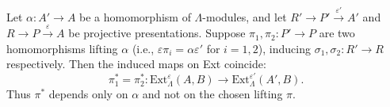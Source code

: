 Let $\alpha : A' \to A$ be a homomorphism of $\Lambda$-modules, and let $R' \to P' \xrightarrow{\varepsilon'} A'$ and $R \to P \xrightarrow{\varepsilon} A$ be projective presentations. Suppose $\pi_1, \pi_2 : P' \to P$ are two homomorphisms lifting $\alpha$ (i.e., $\varepsilon \pi_i = \alpha \varepsilon'$ for $i = 1, 2$), inducing $\sigma_1, \sigma_2 : R' \to R$ respectively. Then the induced maps on Ext coincide:
$$\pi_1^* = \pi_2^* : \text{Ext}_\Lambda^\varepsilon(A, B) \to \text{Ext}_\Lambda^{\varepsilon'}(A', B).$$
Thus $\pi^*$ depends only on $\alpha$ and not on the chosen lifting $\pi$.
